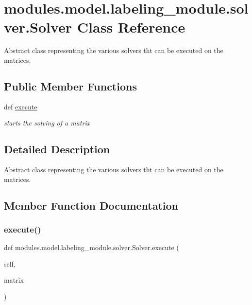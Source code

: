 \hypertarget{classmodules_1_1model_1_1labeling__module_1_1solver_1_1_solver}{}\section{modules.\+model.\+labeling\+\_\+module.\+solver.\+Solver Class Reference}
\label{classmodules_1_1model_1_1labeling__module_1_1solver_1_1_solver}


Abstract class representing the various solvers tht can be executed on the matrices.  


\subsection*{Public Member Functions}
\begin{DoxyCompactItemize}
\item 
def \mbox{\hyperlink{classmodules_1_1model_1_1labeling__module_1_1solver_1_1_solver_a8e681ff0a63b2b324a0dfdec17efcaf7}{execute}}
\begin{DoxyCompactList}\small\item\em starts the solving of a matrix \end{DoxyCompactList}\end{DoxyCompactItemize}


\subsection{Detailed Description}
Abstract class representing the various solvers tht can be executed on the matrices. 

\subsection{Member Function Documentation}
\mbox{\label{classmodules_1_1model_1_1labeling__module_1_1solver_1_1_solver_a8e681ff0a63b2b324a0dfdec17efcaf7}} 
\subsubsection{\texorpdfstring{execute()}{execute()}}
{\footnotesize\ttfamily def modules.\+model.\+labeling\+\_\+module.\+solver.\+Solver.\+execute (\begin{DoxyParamCaption}\item[{}]{self,  }\item[{}]{matrix }\end{DoxyParamCaption})}



